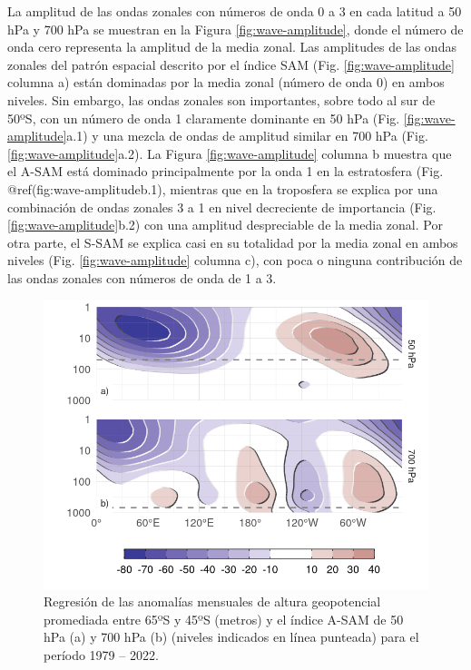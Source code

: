 \documentclass[12pt,oneside]{reedthesis}
\begin{document}
La amplitud de las ondas zonales con números de onda 0 a 3 en cada latitud a 50 hPa y 700 hPa se muestran en la Figura \ref{fig:wave-amplitude}, donde el número de onda cero representa la amplitud de la media zonal.
Las amplitudes de las ondas zonales del patrón espacial descrito por el índice SAM (Fig. \ref{fig:wave-amplitude} columna a) están dominadas por la media zonal (número de onda 0) en ambos niveles.
Sin embargo, las ondas zonales son importantes, sobre todo al sur de 50ºS, con un número de onda 1 claramente dominante en 50 hPa (Fig. \ref{fig:wave-amplitude}a.1) y una mezcla de ondas de amplitud similar en 700 hPa (Fig. \ref{fig:wave-amplitude}a.2).
La Figura \ref{fig:wave-amplitude} columna b muestra que el A-SAM está dominado principalmente por la onda 1 en la estratosfera (Fig. @ref(fig:wave-amplitudeb.1), mientras que en la troposfera se explica por una combinación de ondas zonales 3 a 1 en nivel decreciente de importancia (Fig. \ref{fig:wave-amplitude}b.2) con una amplitud despreciable de la media zonal.
Por otra parte, el S-SAM se explica casi en su totalidad por la media zonal en ambos niveles (Fig. \ref{fig:wave-amplitude} columna c), con poca o ninguna contribución de las ondas zonales con números de onda de 1 a 3.



\begin{figure}
\includegraphics{figures/30-sam/vertical-regression-1} \caption{Regresión de las anomalías mensuales de altura geopotencial promediada entre 65ºS y 45ºS (metros) y el índice A-SAM de 50 hPa (a) y 700 hPa (b) (niveles indicados en línea punteada) para el período 1979 -- 2022.}\label{fig:vertical-regression}
\end{figure}
\end{document}

